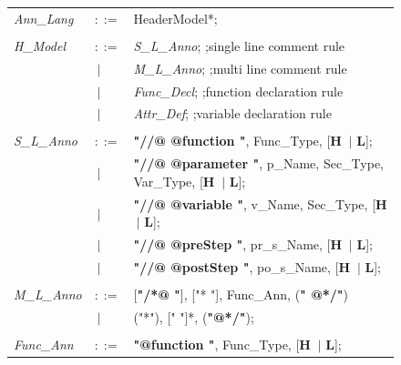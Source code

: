 \begin{figure}[ht!]
	\begin{tabular}{lll}
		\footnotesize                       
		\textit{Ann\_Lang}           &\footnotesize $::=$         &\footnotesize HeaderModel*;       \\ \\
		
		\footnotesize
		\textit{H\_Model}            &\footnotesize $::=$         &\footnotesize \textit{S\_L\_Anno};       \hfill ;single line comment rule   \\     
		&\footnotesize $\ \vert $    &\footnotesize \textit{M\_L\_Anno};       \hfill ;multi line comment rule    \\ 
		&\footnotesize $\ \vert $    &\footnotesize \textit{Func\_Decl};       \hfill ;function declaration rule  \\ 
		&\footnotesize $\ \vert $    &\footnotesize \textit{Attr\_Def};        \hfill ;variable declaration rule  \\ \\
		\footnotesize  	
		\textit{S\_L\_Anno}          &\footnotesize $::=$         &\footnotesize \textbf{"//@ @function "},    Func\_Type,              [\textbf{H} $\ \vert $  \textbf{L}];     \\
		&\footnotesize $\ \vert $    &\footnotesize \textbf{"//@ @parameter "},   p\_Name,  Sec\_Type, Var\_Type,    [\textbf{H} $\ \vert $  \textbf{L}];    \\
		&\footnotesize $\ \vert $    &\footnotesize \textbf{"//@ @variable "},    v\_Name,  Sec\_Type,     [\textbf{H} $\ \vert $  \textbf{L}];    \\
		&\footnotesize $\ \vert $    &\footnotesize \textbf{"//@ @preStep "},     pr\_s\_Name,             [\textbf{H} $\ \vert $  \textbf{L}];    \\
		&\footnotesize $\ \vert $    &\footnotesize \textbf{"//@ @postStep "},    po\_s\_Name,             [\textbf{H} $\ \vert $  \textbf{L}];    \\ \\   
		\footnotesize            
		\textit{M\_L\_Anno}          &\footnotesize $::=$         &\footnotesize [\textbf{"/*@ "}],  ["* "],  Func\_Ann,  (\textbf{" @*/"}) \\
		&\footnotesize $\ \vert $    &\footnotesize ("*"), [" "]*, (\textbf{"@*/"});                  \\ \\
		\footnotesize        
		\textit{Func\_Ann}           &\footnotesize $::=$         &\footnotesize \textbf{"@function "},    Func\_Type,              [\textbf{H} $\ \vert $  \textbf{L}];     \\

\end{tabular}
\end{figure}
